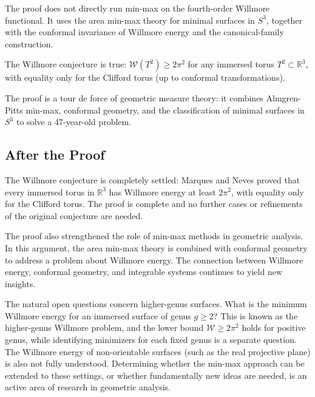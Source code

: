 The proof does not directly run min-max on the fourth-order Willmore functional. It uses the area min-max theory for minimal surfaces in $S^3$, together with the conformal invariance of Willmore energy and the canonical-family construction.

\begin{theorem}
The Willmore conjecture is true: $\mathcal{W}(T^2) \ge 2\pi^2$ for any immersed torus $T^2 \subset \mathbb{R}^3$, with equality only for the Clifford torus (up to conformal transformations).
\end{theorem}

\begin{highlightbox}
The proof is a tour de force of geometric measure theory: it combines Almgren-Pitts min-max, conformal geometry, and the classification of minimal surfaces in $S^3$ to solve a 47-year-old problem.
\end{highlightbox}

\subsection{After the Proof}

The Willmore conjecture is completely settled: Marques and Neves proved that every immersed torus in $\mathbb{R}^3$ has Willmore energy at least $2\pi^2$, with equality only for the Clifford torus. The proof is complete and no further cases or refinements of the original conjecture are needed.

The proof also strengthened the role of min-max methods in geometric analysis. In this argument, the area min-max theory is combined with conformal geometry to address a problem about Willmore energy. The connection between Willmore energy, conformal geometry, and integrable systems continues to yield new insights.

The natural open questions concern higher-genus surfaces. What is the minimum Willmore energy for an immersed surface of genus $g \ge 2$? This is known as the higher-genus Willmore problem, and the lower bound $\mathcal W\geq 2\pi^2$ holds for positive genus, while identifying minimizers for each fixed genus is a separate question. The Willmore energy of non-orientable surfaces (such as the real projective plane) is also not fully understood. Determining whether the min-max approach can be extended to these settings, or whether fundamentally new ideas are needed, is an active area of research in geometric analysis.

